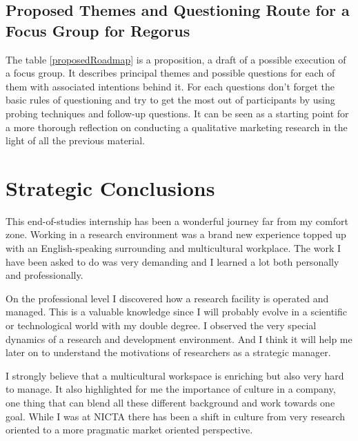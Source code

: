 \documentclass[10pt]{report}
\begin{document}
\subsection{Proposed Themes and Questioning Route for a Focus Group for Regorus}

The table \ref{proposedRoadmap} is a proposition, a draft of a possible execution of a focus group. It describes principal themes and possible questions for each of them with associated intentions behind it. For each questions don't forget the basic rules of questioning and try to get the most out of participants by using probing techniques and follow-up questions. It can be seen as a starting point for a more thorough reflection on conducting a qualitative marketing research in the light of all the previous material.



\renewcommand{\familydefault}{\sfdefault}
\renewcommand{\arraystretch}{1.5}


\newpage
{}

\newpage
{}
\section*{Strategic Conclusions}
This end-of-studies internship has been a wonderful journey far from my comfort zone. Working in a research environment was a brand new experience topped up with an English-speaking surrounding and multicultural workplace. The work I have been asked to do was very demanding and I learned a lot both personally and professionally.

On the professional level I discovered how a research facility is operated and managed. This is a valuable knowledge since I will probably evolve in a scientific or technological world with my double degree. I observed the very special dynamics of a research and development environment. And I think it will help me later on to understand the motivations of researchers as a strategic manager. 

I strongly believe that a multicultural workspace is enriching but also very hard to manage. It also highlighted for me the importance of culture in a company, one thing that can blend all these different background and work towards one goal. While I was at NICTA there has been a shift in culture from very research oriented to a more pragmatic market oriented perspective. 
\end{document}

